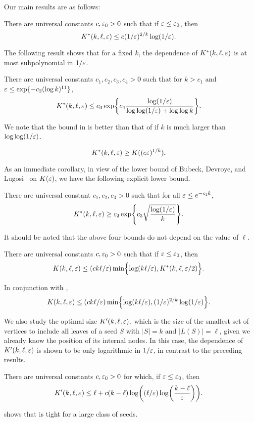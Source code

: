 Our main results are as follows:
\begin{thm}
  There are universal constants $c, \varepsilon_0 > 0$ such that if
  $\varepsilon \le \varepsilon_0$, then
  \[
    K^*(k, \ell, \varepsilon) \le c (1/\varepsilon)^{2/k} \log (1/\varepsilon) .
  \]
\end{thm}
The following result shows that for a fixed $k$, the dependence of
$K^*(k, \ell, \varepsilon)$ is at most subpolynomial in $1/\varepsilon$.
\begin{thm}
  There are universal constants $c_1, c_2, c_3, c_4 > 0$ such that for
  $k > c_1$ and $\varepsilon \le \exp\{-c_2  (\log k)^{11}\}$,
  \[
    K^*(k, \ell, \eps) \le c_3 \exp\left\{c_4 \frac{\log (1/\eps)}{\log \log (1/\eps) + \log \log k} \right\} .
  \]
\end{thm}
We note that the bound in  is better than that of
 if $k$ is much larger than
$\log \log (1/\varepsilon)$.

\begin{thm}
  \[
    K^*(k, \ell, \varepsilon) \ge K((e \varepsilon)^{1/k}) .
  \]
\end{thm}
As an immediate corollary, in view of the lower bound of Bubeck,
Devroye, and Lugosi~\cite[Theorem~4]{finding-adam} on $K(\varepsilon)$, we
have the following explicit lower bound.
\begin{cor}
  There are universal constant $c_1, c_2, c_3 > 0$ such that for all
  $\varepsilon \le e^{-c_1 k}$,
  \[
    K^*(k, \ell, \eps) \ge c_2 \exp\left\{c_3 \sqrt{ \frac{\log (1/\eps)}{k}} \right\} .
  \]
\end{cor}
It should be noted that the above four bounds do not depend on the
value of $\ell$.

\begin{thm}
  There are universal constants $c, \varepsilon_0 > 0$ such that if
  $\varepsilon \le \varepsilon_0$, then
  \[
    K(k, \ell, \varepsilon) \le (c k \ell/\varepsilon)  \min\Bigl\{\log (k \ell/\varepsilon), K^*(k, \ell, \varepsilon/2)\Bigr\} .
  \]
\end{thm}
In conjunction with ,
\[
  K(k, \ell, \eps) \le (c k \ell/\eps) \min\left\{\log(k \ell/\eps), (1/\eps)^{2/k} \log (1/\eps)\right\} .
\]

We also study the optimal size $K'(k, \ell, \varepsilon)$, which is the size
of the smallest set of vertices to include all leaves of a seed $S$
with $|S| = k$ and $|L(S)| = \ell$, given we already know the position
of its internal nodes. In this case, the dependence of
$K'(k, \ell, \varepsilon)$ is shown to be only logarithmic in $1/\varepsilon$, in
contrast to the preceding results.
\begin{thm}
  There are universal constants $c , \varepsilon_0 > 0$ for which, if
  $\varepsilon \le \varepsilon_0$, then
  \[
    K'(k, \ell, \eps) \le \ell + c (k - \ell) \log \left( (\ell/\eps) \log \left( \frac{k - \ell}{\eps} \right) \right) .
  \]
\end{thm}
 shows that  is tight
for a large class of seeds.

